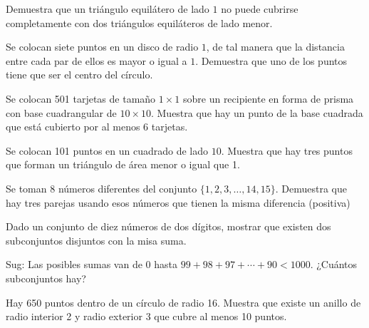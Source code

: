 \begin{ejercicio}
Demuestra que un triángulo equilátero de lado $1$ no puede cubrirse completamente con dos triángulos equiláteros de lado menor.
\end{ejercicio}
\vspace{2cm}

\begin{ejercicio}
Se colocan siete puntos en un disco de radio $1$, de tal manera que la distancia entre cada par de ellos es mayor o igual a $1$. Demuestra que uno de los puntos tiene que ser el centro del círculo.
\end{ejercicio}
\vspace{2cm}

\begin{ejercicio}
Se colocan 501 tarjetas de tamaño $1\times 1$ sobre un recipiente en forma de prisma con base cuadrangular de $10\times 10$. Muestra que hay un punto de la base cuadrada que está cubierto por al menos 6 tarjetas.
\end{ejercicio}
\vspace{2cm}


\begin{ejercicio}
Se colocan 101 puntos en un cuadrado de lado $10$. Muestra que hay tres puntos que forman un triángulo de área menor o igual que 1.
\end{ejercicio}
\vspace{2cm}

\begin{ejercicio}
Se toman 8 números diferentes del conjunto $\{1, 2, 3, \dots , 14, 15 \}$. Demuestra que hay tres parejas usando esos números que tienen la misma diferencia (positiva) 
\end{ejercicio}
\vspace{2cm}

\newpage
\begin{problema}
Dado un conjunto de diez números de dos dígitos, mostrar que existen dos subconjuntos disjuntos con la misa suma.
\end{problema}
Sug: Las posibles sumas van de $0$ hasta $99+98+97+\cdots +90 < 1000$. ¿Cuántos subconjuntos hay?
\vspace{2cm}


\begin{ejercicio}
Hay 650 puntos dentro de un círculo de radio 16. Muestra que existe un anillo de radio interior 2 y radio exterior 3 que cubre al menos 10 puntos.
\end{ejercicio}
\vspace{2cm}

